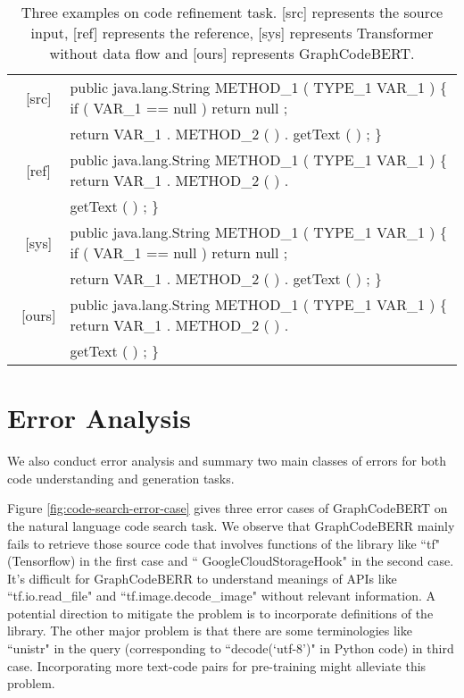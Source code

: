 \documentclass{article} \usepackage{iclr2021_conference,times}
\begin{document}
\begin{table*}[h!]
\begin{center}
\begin{tabular}{c|l}
\midrule
\ [src] & public java.lang.String METHOD\_1 ( TYPE\_1 VAR\_1 ) \{ if ( VAR\_1 == null ) return null ; \\
& return VAR\_1 . METHOD\_2 ( ) . getText ( ) ; \} \\
\hline
\ [ref] & public java.lang.String METHOD\_1 ( TYPE\_1 VAR\_1 ) \{ return VAR\_1 . METHOD\_2 ( ) . \\
& getText ( ) ; \} \\
\hline
\ [sys] & public java.lang.String METHOD\_1 ( TYPE\_1 VAR\_1 ) \{ if ( VAR\_1 == null ) return null ; \\
& return VAR\_1 . METHOD\_2 ( ) . getText ( ) ; \} \\
\hline
\ [ours] & public java.lang.String METHOD\_1 ( TYPE\_1 VAR\_1 ) \{ return VAR\_1 . METHOD\_2 ( ) . \\
& getText ( ) ; \} \\
\bottomrule
\end{tabular}
\end{center}
\caption{\label{tab:refine_good_case} Three examples on code refinement task. [src] represents the source input, [ref] represents the reference, [sys] represents Transformer without data flow and [ours] represents GraphCodeBERT.}
\end{table*}


\section{Error Analysis}
We also conduct error analysis and summary two main classes of errors for both code understanding and generation tasks. 

Figure \ref{fig:code-search-error-case} gives three error cases of GraphCodeBERT on the natural language code search task. We observe that GraphCodeBERR mainly fails to retrieve those source code that involves functions of the library like ``tf" (Tensorflow) in the first case and `` GoogleCloudStorageHook" in the second case. It's difficult for GraphCodeBERR to understand meanings of APIs like ``tf.io.read\_file" and ``tf.image.decode\_image" without relevant information. A potential direction to mitigate the problem is to incorporate definitions of the library.
The other major problem is that there are some terminologies like ``unistr" in the query (corresponding to ``decode(`utf-8')" in Python code) in third case.  Incorporating more text-code pairs for pre-training might alleviate this problem. 
\end{document}

